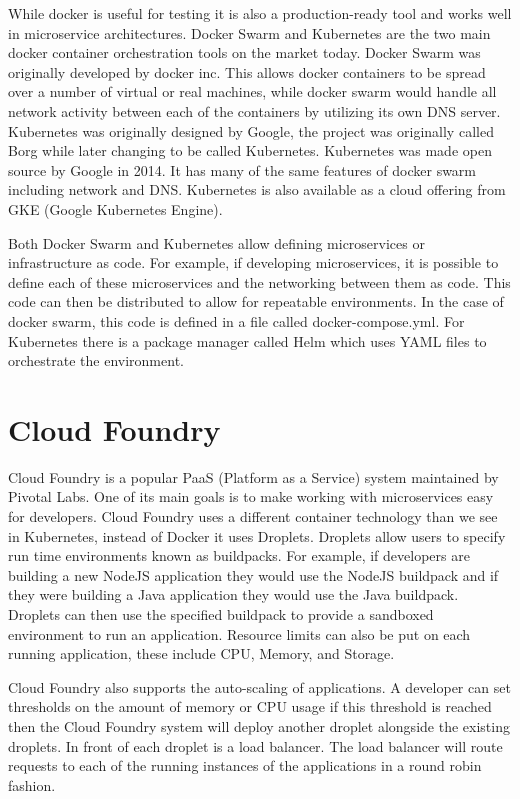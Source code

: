 While docker is useful for testing it is also a production-ready tool and works well in microservice architectures. Docker Swarm and Kubernetes are the two main docker container orchestration tools on the market today. Docker Swarm was originally developed by docker inc. This allows docker containers to be spread over a number of virtual or real machines, while docker swarm would handle all network activity between each of the containers by utilizing its own DNS server. Kubernetes was originally designed by Google, the project was originally called Borg while later changing to be called Kubernetes. Kubernetes was made open source by Google in 2014. It has many of the same features of docker swarm including network and DNS. Kubernetes is also available as a cloud offering from GKE (Google Kubernetes Engine). 

Both Docker Swarm and Kubernetes allow defining microservices or infrastructure as code. For example, if developing microservices, it is possible to define each of these microservices and the networking between them as code. This code can then be distributed to allow for repeatable environments. In the case of docker swarm, this code is defined in a file called docker-compose.yml. For Kubernetes there is a package manager called Helm which uses YAML files to orchestrate the environment.

\section{Cloud Foundry}

Cloud Foundry is a popular PaaS (Platform as a Service) system maintained by Pivotal Labs. One of its main goals is to make working with microservices easy for developers. Cloud Foundry uses a different container technology than we see in Kubernetes, instead of Docker it uses Droplets. Droplets allow users to specify run time environments known as buildpacks. For example, if developers are building a new NodeJS application they would use the NodeJS buildpack and if they were building a Java application they would use the Java buildpack. Droplets can then use the specified buildpack to provide a sandboxed environment to run an application. Resource limits can also be put on each running application, these include CPU, Memory, and Storage.

Cloud Foundry also supports the auto-scaling of applications. A developer can set thresholds on the amount of memory or CPU usage if this threshold is reached then the Cloud Foundry system will deploy another droplet alongside the existing droplets. In front of each droplet is a load balancer. The load balancer will route requests to each of the running instances of the applications in a round robin fashion.

